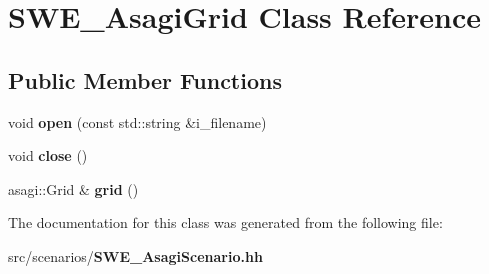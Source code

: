 \section{S\-W\-E\-\_\-\-Asagi\-Grid Class Reference}
\label{classSWE__AsagiGrid}
\subsection*{Public Member Functions}
\begin{DoxyCompactItemize}
\item 
void {\bfseries open} (const std\-::string \&i\-\_\-filename)\label{classSWE__AsagiGrid_a36c68a45fd51ed1bae1971ac252ed1cc}

\item 
void {\bfseries close} ()\label{classSWE__AsagiGrid_ab0dca1af30b0d89f3a68f429c77b0840}

\item 
asagi\-::\-Grid \& {\bfseries grid} ()\label{classSWE__AsagiGrid_a8596fb0fdadd3ab51760d7101d6e89d1}

\end{DoxyCompactItemize}


The documentation for this class was generated from the following file\-:\begin{DoxyCompactItemize}
\item 
src/scenarios/{\bf S\-W\-E\-\_\-\-Asagi\-Scenario.\-hh}\end{DoxyCompactItemize}
